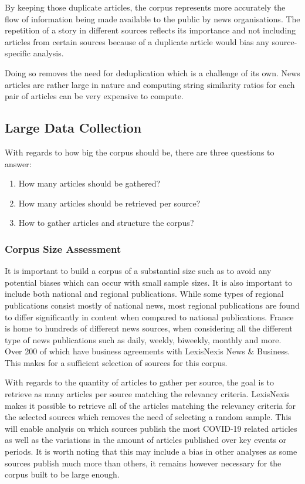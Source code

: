By keeping those duplicate articles, the corpus represents more accurately the flow of information being made available to the public by news organisations. The repetition of a story in different sources reflects its importance and not including articles from certain sources because of a duplicate article would bias any source-specific analysis.

Doing so removes the need for deduplication which is a challenge of its own. News articles are rather large in nature and computing string similarity ratios for each pair of articles can be very expensive to compute.

\subsection{Large Data Collection}\label{Data Collection}

With regards to how big the corpus should be, there are three questions to answer:
\begin{enumerate}
    \item How many articles should be gathered?
    \item How many articles should be retrieved per source?
    \item How to gather articles and structure the corpus?
\end{enumerate}

\subsubsection{Corpus Size Assessment}

It is important to build a corpus of a substantial size such as to avoid any potential biases which can occur with small sample sizes. It is also important to include both national and regional publications. While some types of regional publications consist mostly of national news, most regional publications are found to differ significantly in content \cite{ballarini2008presse} when compared to national publications. France is home to hundreds of different news sources, when considering all the different type of news publications such as daily, weekly, biweekly, monthly and more. Over 200 of which have business agreements with LexisNexis News \& Business. This makes for a sufficient selection of sources for this corpus.

With regards to the quantity of articles to gather per source, the goal is to retrieve as many articles per source matching the relevancy criteria. LexisNexis makes it possible to retrieve all of the articles matching the relevancy criteria for the selected sources which removes the need of selecting a random sample. This will enable analysis on which sources publish the most COVID-19 related articles as well as the variations in the amount of articles published over key events or periods. It is worth noting that this may include a bias in other analyses as some sources publish much more than others, it remains however necessary for the corpus built to be large enough.


